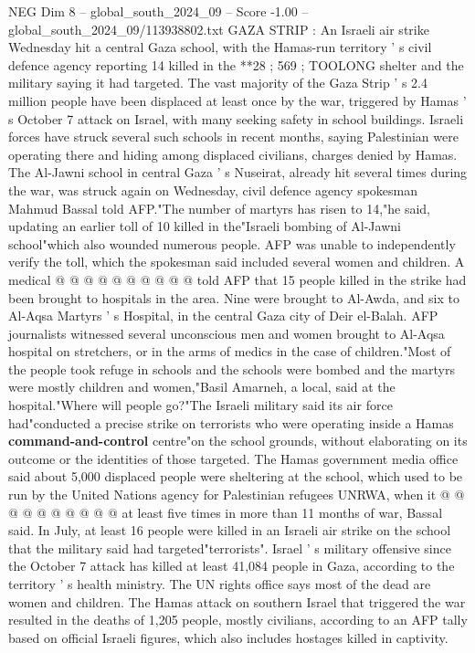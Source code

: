 \begin{textsample}{NEG Dim 8 – global\_south\_2024\_09 – Score -1.00 – global\_south\_2024\_09/113938802.txt}  \label{ex:f8_neg_210}
GAZA STRIP : An Israeli air strike Wednesday hit a central Gaza school, with the Hamas-run territory ' s civil defence agency reporting 14 killed in the **28 ; 569 ; TOOLONG shelter and the military saying it had targeted.
The vast majority of the Gaza Strip ' s 2.4 million people have been displaced at least once by the war, triggered by Hamas ' s October 7 attack on Israel, with many seeking safety in school buildings.
Israeli forces have struck several such schools in recent months, saying Palestinian were operating there and hiding among displaced civilians, charges denied by Hamas.
The Al-Jawni school in central Gaza ' s Nuseirat, already hit several times during the war, was struck again on Wednesday, civil defence agency spokesman Mahmud Bassal told AFP."The number of martyrs has risen to 14,"he said, updating an earlier toll of 10 killed in the"Israeli bombing of Al-Jawni school"which also wounded numerous people.
AFP was unable to independently verify the toll, which the spokesman said included several women and children.
A medical @ @ @ @ @ @ @ @ @ @ told AFP that 15 people killed in the strike had been brought to hospitals in the area.
Nine were brought to Al-Awda, and six to Al-Aqsa Martyrs ' s Hospital, in the central Gaza city of Deir el-Balah.
AFP journalists witnessed several unconscious men and women brought to Al-Aqsa hospital on stretchers, or in the arms of medics in the case of children."Most of the people took refuge in schools and the schools were bombed and the martyrs were mostly children and women,"Basil Amarneh, a local, said at the hospital."Where will people go?"The Israeli military said its air force had"conducted a precise strike on terrorists who were operating inside a Hamas \textbf{command-and-control} centre"on the school grounds, without elaborating on its outcome or the identities of those targeted.
The Hamas government media office said about 5,000 displaced people were sheltering at the school, which used to be run by the United Nations agency for Palestinian refugees UNRWA, when it @ @ @ @ @ @ @ @ @ @ at least five times in more than 11 months of war, Bassal said.
In July, at least 16 people were killed in an Israeli air strike on the school that the military said had targeted"terrorists".
Israel ' s military offensive since the October 7 attack has killed at least 41,084 people in Gaza, according to the territory ' s health ministry.
The UN rights office says most of the dead are women and children.
The Hamas attack on southern Israel that triggered the war resulted in the deaths of 1,205 people, mostly civilians, according to an AFP tally based on official Israeli figures, which also includes hostages killed in captivity.

\end{textsample}
